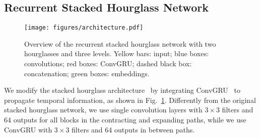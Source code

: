 \documentclass[runningheads,a4paper]{llncs}
\begin{document}
\subsection{Recurrent Stacked Hourglass Network}
\label{subsec:network}

\begin{figure}[t]
\centering
\texttt{[image: figures/architecture.pdf]}
\caption{Overview of the recurrent stacked hourglass network with two hourglasses and three levels.
Yellow bars: input; blue boxes: convolutions; red boxes: \mbox{ConvGRU}; dashed black box: concatenation; green boxes: embeddings.}
\label{fig:architecture}
\end{figure}

We modify the stacked hourglass architecture~\cite{Newell2016} by integrating \mbox{ConvGRU}~\cite{Ballas2015} to propagate temporal information, as shown in Fig.~\ref{fig:architecture}.
Differently from the original stacked hourglass network, we use single convolution layers with $3\times3$ filters and 64 outputs for all blocks in the contracting and expanding paths, while we use \mbox{ConvGRU} with $3\times3$ filters and 64 outputs in between paths.
\end{document}
